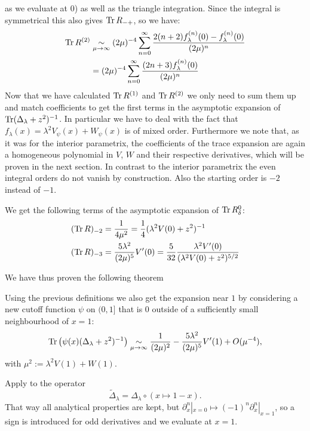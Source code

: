 as we evaluate at $0$) as well as the triangle integration. Since the integral
is symmetrical this also gives $\operatorname{Tr} R_{-+}$, so we have:
\begin{equation}
  \label{eqn:tr2}
  \begin{split}
    \operatorname{Tr} R^{(2)} &\mathrel{\underset{\mu\to\infty}{\sim}} (2\mu)^{-4} \sum_{n=0}^\infty
  \frac{2(n+2)f_\lambda^{(n)}(0) - f^{(n)}_\lambda(0)}{(2\mu)^n} \\ &=
    (2\mu)^{-4} \sum_{n=0}^\infty \frac{(2n + 3)f_\lambda^{(n)}(0)}{(2\mu)^n}
  \end{split}
\end{equation}
Now that we have calculated $\operatorname{Tr} R^{(1)}$ and $\operatorname{Tr} R^{(2)}$ we only need to sum
them up and match coefficients to get the first terms in the asymptotic
expansion of $\operatorname{Tr}(\Delta_\lambda + z^2)^{-1}$. In particular we have to deal
with the fact that $f_\lambda(x) = \lambda^2 V_\psi(x) + W_\psi(x)$ is of mixed
order.  Furthermore we note that, as it was for the interior parametrix, the
coefficients of the trace expansion are again a homogeneous polynomial in $V$,
$W$ and their respective derivatives, which will be proven in the next section.
In contrast to the interior parametrix the even integral orders do not vanish by
construction. Also the starting order is $-2$ instead of $-1$.

We get the following terms of the asymptotic expansion of $\operatorname{Tr} R^0_\delta$:
\begin{align}
  (\operatorname{Tr} R)_{-2} &= \frac{1}{4\mu^2} = \frac{1}{4} (\lambda^2V(0) + z^2)^{-1} \\
  (\operatorname{Tr} R)_{-3} &= \frac{5\lambda^2}{(2\mu)^5} V'(0) =
  \frac{5}{32}\frac{\lambda^2 V'(0)}{(\lambda^2 V(0) + z^2)^{5/2}}
\end{align}

We have thus proven the following theorem
\begin{MainTheorem}
  \label{main:boundary}
  
  \begin{Corollary}
    \label{cor:boundary}
    Using the previous definitions we also get the expansion near $1$ by
    considering a new cutoff function $\psi$ on $(0,1]$ that is $0$ outside of a
    sufficiently small neighbourhood of $x=1$:
    \begin{equation*}
      \operatorname{Tr}\left(\psi(x)(\Delta_\lambda + z^2)^{-1}\right) \mathrel{\underset{\mu\to\infty}{\sim}}
      \frac{1}{(2\mu)^2} - \frac{5\lambda^2}{(2\mu)^5} V'(1) + O(\mu^{-4}),
    \end{equation*}
    with $\mu^2 := \lambda^2 V(1) + W(1)$.
    \begin{Proof}
      Apply  to the operator
      \begin{equation*}
        \tilde\Delta_\lambda = \Delta_\lambda\circ(x\mapsto 1-x).
      \end{equation*}
      That way all analytical properties are kept, but $\partial_x^n|_{x=0}
      \mapsto (-1)^n \partial_x^n|_{x=1}$, so a sign is introduced for odd
      derivatives and we evaluate at $x=1$.
    \end{Proof}
  \end{Corollary}
\end{MainTheorem}
